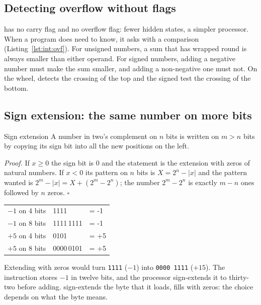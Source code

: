 \subsection{Detecting overflow without flags}

\riscv has no carry flag and no overflow flag: fewer hidden states, a simpler
processor. When a program does need to know, it asks with a comparison
(Listing~\ref{lst:int:ovf}). For unsigned numbers, a sum that has wrapped
round is always smaller than either operand. For signed numbers, adding a
negative number must make the sum smaller, and adding a non-negative one must
not. On the wheel,  detects the crossing of the top and the signed
test the crossing of the bottom.


\subsection{Sign extension: the same number on more bits}

\begin{theorem}{Sign extension}
A number in two's complement on $n$ bits is written on $m>n$ bits by copying
its sign bit into all the new positions on the left.
\end{theorem}

\noindent\emph{Proof.} If $x\ge 0$ the sign bit is 0 and the statement is the
extension with zeros of natural numbers. If $x<0$ its pattern on $n$ bits is
$X=2^{n}-|x|$ and the pattern wanted is $2^{m}-|x| = X + (2^{m}-2^{n})$; the
number $2^{m}-2^{n}$ is exactly $m-n$ ones followed by $n$ zeros.
\hfill$\square$

\begin{center}\ttfamily
\begin{tabular}{@{}r@{\quad}l@{\quad}l@{}}
\textsf{$-1$ on 4 bits} & \phantom{1111\,}1111 & = -1\\
\textsf{$-1$ on 8 bits} & \textcolor{prgred}{1111}\,1111 & = -1\\
\textsf{$+5$ on 4 bits} & \phantom{0000\,}0101 & = +5\\
\textsf{$+5$ on 8 bits} & \textcolor{prgsteel}{0000}\,0101 & = +5\\
\end{tabular}
\end{center}

Extending with zeros would turn \texttt{1111} ($-1$) into \texttt{0000\,1111}
($+15$). The instruction  stores $-1$ in twelve bits,
and the processor sign-extends it to thirty-two before adding. 
sign-extends the byte that it loads,  fills with zeros: the choice
depends on what the byte means.

